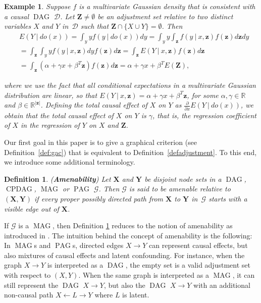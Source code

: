 \documentclass[11pt,a4paper]{article}
\newtheorem{definition}{Definition}
\newtheorem{example}{Example}
\newcommand\given[1][]{\:#1\vert\:}
\DeclareMathOperator{\CPDAG}{CPDAG}
\DeclareMathOperator{\DAG}{DAG}
\DeclareMathOperator{\MAG}{MAG}
\DeclareMathOperator{\PAG}{PAG}
\newcommand{\g}[1][G]{\mathcal{#1}}
\begin{document}
\begin{example}
Suppose $f$ is a multivariate Gaussian density that is consistent with a causal $\DAG$ $\g[D]$. Let $\mathbf{Z} \neq \emptyset$ be an adjustment set relative to two distinct variables $X$ and $Y$ in~$\g[D]$ such that $\mathbf{Z} \cap \{ X \cup Y \} = \emptyset$. Then
\begin{align}
&E(Y \given do(x)) =  \int_{y} y f(y \given do(x))dy  =   \int_{y} y \int_\mathbf{z} f(y \given x,\mathbf{z})f(\mathbf{z})d\mathbf{z}dy  \nonumber \\
& =  \int_\mathbf{z} \int_{y} y f(y \given x,\mathbf{z})dyf(\mathbf{z})d\mathbf{z} = \int_\mathbf{z} E(Y \given x,\mathbf{z})f(\mathbf{z})d\mathbf{z}  \nonumber \\
&=  \int_\mathbf{z}(\alpha + \gamma x + \beta^T \mathbf{z})f(\mathbf{z})d\mathbf{z}=\alpha + \gamma x + \beta^T E(\mathbf{Z}), \nonumber
\end{align}

\noindent{}where we use the fact that all conditional expectations in a multivariate Gaussian distribution are linear, so that $E(Y \given x,\mathbf{z}) = \alpha + \gamma x + \beta^{T} \mathbf{z}$, for some $\alpha, \gamma \in \mathbb{R}$ and $\beta \in \mathbb{R}^{|\mathbf{z}|}$. Defining the total causal effect of $X$ on $Y$ as $\frac{\partial }{\partial x}E(Y \given do(x))$, we obtain that the total causal effect of $X$ on $Y$ is $\gamma$, that is, the regression coefficient of $X$ in the regression of $Y$ on $X$ and $\mathbf{Z}$.
\label{ex:gaussian-linear}
\end{example}

Our first goal in this paper is to give a graphical criterion (see Definition~\ref{def:gac}) that is equivalent to Definition~\ref{defadjustment}. To this end, we introduce some additional terminology.

\begin{definition}{(\textbf{Amenability})}
   Let $\mathbf{X}$ and $\mathbf{Y}$ be disjoint node sets in a $\DAG$, $\CPDAG$, $\MAG$ or $\PAG$ $\g$. Then $\g$ is said to be amenable relative to $(\mathbf{X},\mathbf{Y})$ if every proper possibly directed path from $\mathbf{X}$ to $\mathbf{Y}$ in~$\g$ starts with a visible edge out of $\mathbf{X}$.
  \label{defadjamengen}
\end{definition}

\noindent{}If $\g$ is a $\MAG$, then Definition \ref{defadjamengen} reduces to the notion of amenability as introduced in \cite{vanconstructing}. The intuition behind the concept of amenability is the following: In $\MAG$s and $\PAG$s, directed edges $X\to Y$ can represent causal effects, but also mixtures of causal effects and latent confounding. For instance, when the graph $X \to Y$ is interpreted as a $\DAG$, the empty set is a valid adjustment set with respect to $(X,Y)$. When the same graph is interpreted as a $\MAG$, it can still represent the $\DAG$ $X \to Y$, but also the $\DAG$ $X\to Y$ with an additional non-causal path $X \leftarrow L \to Y$ where $L$ is latent.
\end{document}
